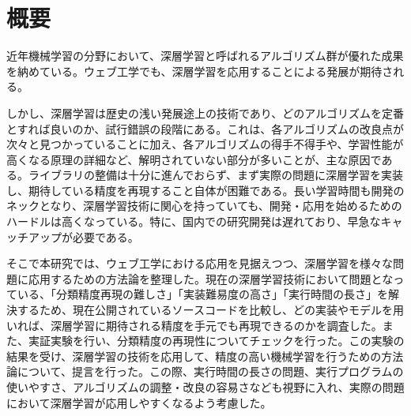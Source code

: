 \chapter*{概要}
近年機械学習の分野において、深層学習と呼ばれるアルゴリズム群が優れた成果を納めている。ウェブ工学でも、深層学習を応用することによる発展が期待される。\par
しかし、深層学習は歴史の浅い発展途上の技術であり、どのアルゴリズムを定番とすれば良いのか、試行錯誤の段階にある。これは、各アルゴリズムの改良点が次々と見つかっていることに加え、各アルゴリズムの得手不得手や、学習性能が高くなる原理の詳細など、解明されていない部分が多いことが、主な原因である。ライブラリの整備は十分に進んでおらず、まず実際の問題に深層学習を実装し、期待している精度を再現すること自体が困難である。長い学習時間も開発のネックとなり、深層学習技術に関心を持っていても、開発・応用を始めるためのハードルは高くなっている。特に、国内での研究開発は遅れており、早急なキャッチアップが必要である。\par
そこで本研究では、ウェブ工学における応用を見据えつつ、深層学習を様々な問題に応用するための方法論を整理した。現在の深層学習技術において問題となっている、「分類精度再現の難しさ」「実装難易度の高さ」「実行時間の長さ」を解決するため、現在公開されているソースコードを比較し、どの実装やモデルを用いれば、深層学習に期待される精度を手元でも再現できるのかを調査した。また、実証実験を行い、分類精度の再現性についてチェックを行った。この実験の結果を受け、深層学習の技術を応用して、精度の高い機械学習を行うための方法論について、提言を行った。この際、実行時間の長さの問題、実行プログラムの使いやすさ、アルゴリズムの調整・改良の容易さなども視野に入れ、実際の問題において深層学習が応用しやすくなるよう考慮した。
